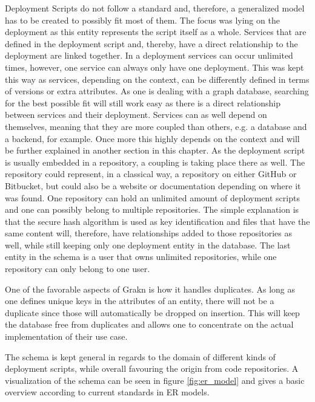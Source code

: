 Deployment Scripts do not follow a standard and, therefore, a generalized model has to be created to possibly fit most of them. The focus was lying on the deployment as this entity represents the script itself as a whole. Services that are defined in the deployment script and, thereby, have a direct relationship to the deployment are linked together. In a deployment services can occur unlimited times, however, one service can always only have one deployment. This was kept this way as services, depending on the context, can be differently defined in terms of versions or extra attributes. As one is dealing with a graph database, searching for the best possible fit will still work easy as there is a direct relationship between services and their deployment.
Services can as well depend on themselves, meaning that they are more coupled than others, e.g. a database and a backend, for example. Once more this highly depends on the context and will be further explained in another section in this chapter. 
As the deployment script is usually embedded in a repository, a coupling is taking place there as well. The repository could represent, in a classical way, a repository on either GitHub or Bitbucket, but could also be a website or documentation depending on where it was found. One repository can hold an unlimited amount of deployment scripts and one can possibly belong to multiple repositories. The simple explanation is that the secure hash algorithm is used as key identification and files that have the same content will, therefore, have relationships added to those repositories as well, while still keeping only one deployment entity in the database. The last entity in the schema is a user that owns unlimited repositories, while one repository can only belong to one user.

One of the favorable aspects of Grakn is how it handles duplicates. As long as one defines unique keys in the attributes of an entity, there will not be a duplicate since those will automatically be dropped on insertion. This will keep the database free from duplicates and allows one to concentrate on the actual implementation of their use case.

The schema is kept general in regards to the domain of different kinds of deployment scripts, while overall favouring the origin from code repositories. A visualization of the schema can be seen in figure \ref{fig:er_model} and gives a basic overview according to current standards in ER models.

